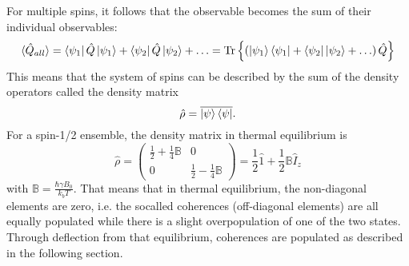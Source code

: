             For multiple spins, it follows that the observable becomes the sum of their individual
            observables:
            \begin{equation}
                \braket{\hat Q_{all}}= \bra{\psi_1}\hat Q\ket{\psi_1} + \bra{\psi_2}\hat Q\ket{\psi_2} + \hdots =
                \operatorname{Tr}{\left\{\left(\ket{\psi_1}\bra{\psi_1} + \bra{\psi_2}\ket{\psi_2}+ \hdots \right) \hat Q\right\}}
            \end{equation}
            This means that the system of spins can be described by the sum of the density operators called
            the density matrix
            \begin{equation}
                \hat\rho = \overline{\ket\psi\bra\psi}.
            \end{equation}
            For a spin-1/2 ensemble, the density matrix in thermal equilibrium is
            \begin{equation}
                \hat \rho = \begin{pmatrix} \frac{1}{2}+\frac{1}{4}\mathbb{B}& 0\\ 0&
                \frac{1}{2}-\frac{1}{4}\mathbb{B}\end{pmatrix} = \frac {1}{2} \hat1 + \frac{1}{2} \mathbb{B}
                \hat I_z
            \end{equation}
            with $\mathbb{B} = \frac{\hbar\gamma B_0}{k_b T}$. That means that in thermal equilibrium, the
            non-diagonal elements are zero, i.e. the socalled coherences (off-diagonal elements) are all
            equally populated while there is a slight overpopulation of one of the two states. Through deflection from that
            equilibrium, coherences are populated as described in the following section.
